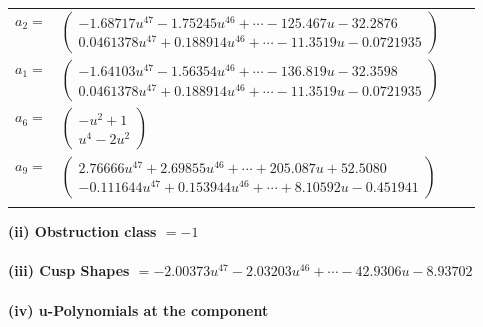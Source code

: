 \documentclass[1p]{elsarticle_modified}
\theoremstyle{definition}
\begin{document}
\begin{tabular}{m{7pt} m{180pt} m{7pt} m{180pt} }
\flushright $a_{2}=$&$\begin{pmatrix}-1.68717 u^{47}-1.75245 u^{46}+\cdots-125.467 u-32.2876\\0.0461378 u^{47}+0.188914 u^{46}+\cdots-11.3519 u-0.0721935\end{pmatrix}$ \\
\flushright $a_{1}=$&$\begin{pmatrix}-1.64103 u^{47}-1.56354 u^{46}+\cdots-136.819 u-32.3598\\0.0461378 u^{47}+0.188914 u^{46}+\cdots-11.3519 u-0.0721935\end{pmatrix}$ \\
\flushright $a_{6}=$&$\begin{pmatrix}- u^2+1\\u^4-2 u^2\end{pmatrix}$ \\
\flushright $a_{9}=$&$\begin{pmatrix}2.76666 u^{47}+2.69855 u^{46}+\cdots+205.087 u+52.5080\\-0.111644 u^{47}+0.153944 u^{46}+\cdots+8.10592 u-0.451941\end{pmatrix}$\\&\end{tabular}
\flushleft \textbf{(ii) Obstruction class $= -1$}\\~\\
\flushleft \textbf{(iii) Cusp Shapes $= -2.00373 u^{47}-2.03203 u^{46}+\cdots-42.9306 u-8.93702$}\\~\\
\newpage\renewcommand{\arraystretch}{1}
\flushleft \textbf{(iv) u-Polynomials at the component}\newline \\
\end{document}
